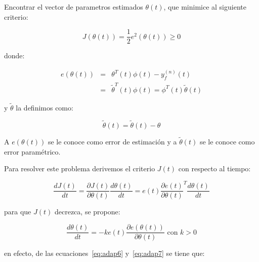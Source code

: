             \begin{problema}
                Encontrar el vector de parametros estimados $\theta(t)$, que minimice al siguiente criterio:

                \begin{equation}
                    J \left( \theta(t) \right) = \frac{1}{2} e^2 \left( \theta(t) \right) \ge 0
                \end{equation}

                donde:

                \begin{eqnarray}
                    e \left( \theta(t) \right) & = & \theta^T(t) \phi(t) - y_f^{(n)}(t) \nonumber \\
                    & = & \tilde{\theta}^T(t) \phi(t) = \phi^T(t) \tilde{\theta}(t)
                \end{eqnarray}

                y $\tilde{\theta}$ la definimos como:

                \begin{equation}
                    \tilde{\theta}(t) = \tilde{\theta}(t) - \theta
                \end{equation}

                A $e \left( \theta(t) \right)$ se le conoce como error de estimación y a $\tilde{\theta}(t)$ se le conoce como error paramétrico.
            \end{problema}

            Para resolver este problema derivemos el criterio $J(t)$ con respecto al tiempo:

            \begin{equation} \label{eq:adap6}
                \frac{d J(t)}{dt} = \frac{\partial J(t)}{\partial \theta(t)} \frac{d \theta(t)}{dt} = e(t) \frac{\partial e(t)}{\partial \theta(t)}^T \frac{d \theta(t)}{dt}
            \end{equation}

            para que $J(t)$ decrezca, se propone:

            \begin{equation}\label{eq:adap7}
                \frac{d \theta(t)}{dt} = -k e(t) \frac{\partial e(\theta(t))}{\partial \theta(t)} \text{ con } k > 0
            \end{equation}

            en efecto, de las ecuaciones~\ref{eq:adap6} y~\ref{eq:adap7} se tiene que:

